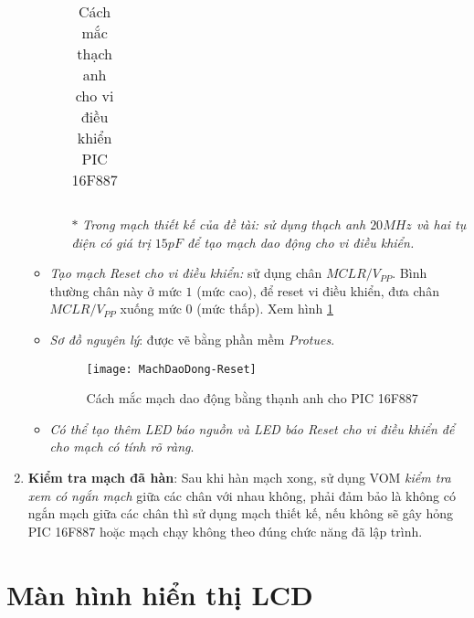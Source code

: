 \begin{enumerate}[{\bf a.}]
\begin{itemize}
\begin{itemize}
\begin{table}[h]
\begin{center}
\begin{tabular}{|c|l|}
\end{tabular}
\end{center}
\caption{Cách mắc thạch anh cho vi điều khiển PIC 16F887}
\end{table}
\item[$\ast$] \textit{Trong mạch thiết kế của đề tài: sử dụng thạch anh $20MHz$ và hai tụ điện có giá trị $15pF$ để tạo mạch dao động cho vi điều khiển.}
\end{itemize}
\item \textit{Tạo mạch Reset cho vi điều khiển:} sử dụng chân $MCLR/V_{PP}$. Bình thường chân này ở mức $1$ (mức cao), để reset vi điều khiển, đưa chân $MCLR/V_{PP}$ xuống mức $0$ (mức thấp). Xem hình \ref{fmachdaodongreset}
\item \textit{Sơ đồ nguyên lý}: được vẽ bằng phần mềm \emph{Protues}.
\begin{figure}[!h]
\begin{center}
\texttt{[image: MachDaoDong-Reset]}
\end{center}
\caption{Cách mắc mạch dao động bằng thạnh anh cho PIC 16F887} \label{fmachdaodongreset}
\end{figure}
\item \textit{Có thể tạo thêm LED báo nguồn và LED báo Reset cho vi điều khiển để cho mạch có tính rõ ràng}.
\end{itemize}
\item \textbf{Kiểm tra mạch đã hàn}: Sau khi hàn mạch xong, sử dụng VOM \textit{kiểm tra xem có ngắn mạch} giữa các chân với nhau không, phải đảm bảo là không có ngắn mạch giữa các chân thì sử dụng mạch thiết kế, nếu không sẽ gây hỏng PIC 16F887 hoặc mạch chạy không theo đúng chức năng đã lập trình.
\end{enumerate}
\section{Màn hình hiển thị LCD}
